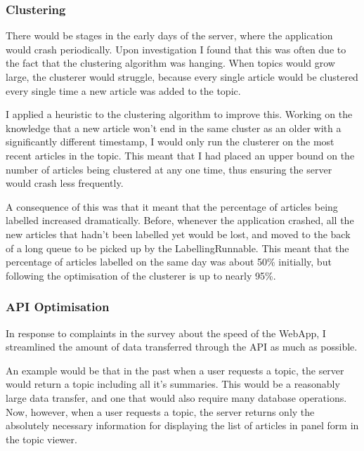 \documentclass[12pt]{article}
\begin{document}
\label{topicmodellingoptimisation}

\subsubsection{Clustering}

There would be stages in the early days of the server, where the application would crash periodically. Upon investigation I found that this was often due to the fact that the clustering algorithm was hanging. When topics would grow large, the clusterer would struggle, because every single article would be clustered every single time a new article was added to the topic.

I applied a heuristic to the clustering algorithm to improve this. Working on the knowledge that a new article won't end in the same cluster as an older with a significantly different timestamp, I would only run the clusterer on the most recent articles in the topic. This meant that I had placed an upper bound on the number of articles being clustered at any one time, thus ensuring the server would crash less frequently.

A consequence of this was that it meant that the percentage of articles being labelled increased dramatically. Before, whenever the application crashed, all the new articles that hadn't been labelled yet would be lost, and moved to the back of a long queue to be picked up by the LabellingRunnable. This meant that the percentage of articles labelled on the same day was about 50\% initially, but following the optimisation of the clusterer is up to nearly 95\%. 

\subsubsection{API Optimisation}

In response to complaints in the survey about the speed of the WebApp, I streamlined the amount of data transferred through the API as much as possible. 

An example would be that in the past when a user requests a topic, the server would return a topic including all it's summaries. This would be a reasonably large data transfer, and one that would also require many database operations. Now, however, when a user requests a topic, the server returns only the absolutely necessary information for displaying the list of articles in panel form in the topic viewer. 

\label{apioptimisation}
\end{document}
